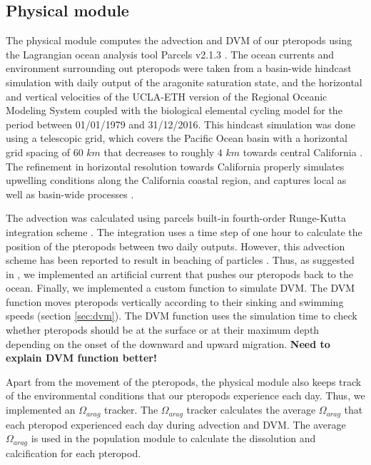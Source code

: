 \subsection{Physical module}

The physical module computes the advection and DVM of our pteropods using the Lagrangian ocean analysis tool Parcels v2.1.3 \citep{Delandmeter2019Unbeaching}. The ocean currents and environment surrounding out pteropods were taken from a basin-wide hindcast simulation with daily output of the aragonite saturation state, and the horizontal and vertical velocities  of the UCLA-ETH version of the Regional Oceanic Modeling System \citep[ROMS; ][]{shchepetkin2005regional} coupled with the biological elemental cycling model \citep[BEC; ][]{moore2013marine} for the period between 01/01/1979 and 31/12/2016. This hindcast simulation was done using a telescopic grid, which covers the Pacific Ocean basin with a horizontal grid spacing of $60$ $km$ that decreases to roughly $4$ $km$ towards central California \citep{frischknecht2018origin}. The refinement in horizontal resolution towards California properly simulates upwelling conditions along the California coastal region, and captures local \citep{frischknecht2018origin} as well as basin-wide processes \citep{frischknecht2015remote,frischknecht2017local}.

The advection was calculated using parcels built-in fourth-order Runge-Kutta integration scheme \citep{Delandmeter2019Unbeaching}. The integration uses a time step of one hour to calculate the position of the pteropods between two daily outputs. However, this advection scheme has been reported to result in beaching of particles \citep{Delandmeter2019Unbeaching}. Thus, as suggested in \cite{Delandmeter2019Unbeaching}, we implemented an artificial current that pushes our pteropods back to the ocean. Finally, we implemented a custom function to simulate DVM. The DVM function moves pteropods vertically according to their sinking and swimming speeds (section \ref{sec:dvm}). The DVM function uses the simulation time to check whether pteropods should be at the surface or at their maximum depth depending on the onset of the downward and upward migration. \textbf{Need to explain DVM function better!}

Apart from the movement of the pteropods, the physical module also keeps track of the environmental conditions that our pteropods experience each day. Thus, we implemented an $\Omega_{arag}$ tracker. The $\Omega_{arag}$ tracker calculates the average $\Omega_{arag}$ that each pteropod experienced each day during advection and DVM. The average $\Omega_{arag}$ is used in the population module to calculate the dissolution and calcification for each pteropod.


